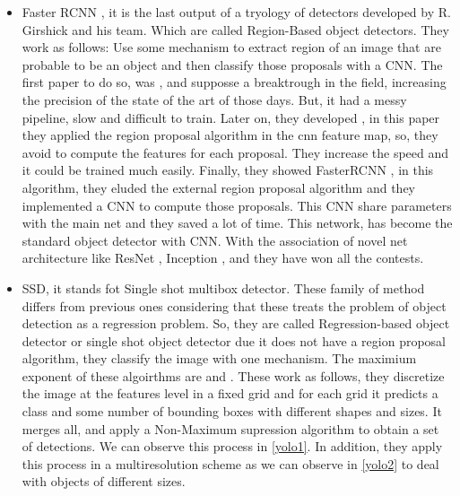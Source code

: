 \documentclass[12pt, a4paper, titlepage,twoside,openright]{article}
\begin{document}
\begin{itemize}

\item Faster RCNN \cite{fasterrcnn}, it is the last output of a tryology of detectors developed by R. Girshick and his team. Which are called Region-Based object detectors. They work as follows: Use some mechanism to extract region of an image that are probable to be an object and then classify those proposals with a CNN. The first paper to do so, was \cite{rcnn}, and supposse a breaktrough in the field, increasing the precision of the state of the art of those days. But, it had a messy pipeline, slow and difficult to train. Later on, they developed \cite{fastrcnn}, in this paper they applied the region proposal algorithm in the cnn feature map, so, they avoid to compute the features for each proposal. They increase the speed and it could be trained much easily. Finally, they showed FasterRCNN \cite{fasterrcnn}, in this algorithm, they eluded the external region proposal algorithm and they implemented a CNN to compute those proposals. This CNN share parameters with the main net and they saved a lot of time. This network, has become the standard object detector with CNN. With the association of novel net architecture like ResNet \cite{resnet}, Inception \cite{inception}, and \cite{pvanet} they have won all the contests.


\item SSD, it stands fot Single shot multibox detector. These family of method differs from previous ones considering that these treats the problem of object detection as a regression problem. So, they are called Regression-based object detector or single shot object detector due it does not have a region proposal algorithm, they classify the image with one mechanism. The maximium exponent of these algoirthms are \cite{yolo} and \cite{ssd}. These work as follows, they discretize the image at the features level in a fixed grid and for each grid it predicts a class and some number of bounding boxes with different shapes and sizes. It merges all, and apply a Non-Maximum supression algorithm to obtain a set of detections. We can observe this process in \ref{yolo1}. In addition, they apply this process in a multiresolution scheme as we can observe in \ref{yolo2} to deal with objects of different sizes.



\end{itemize}
\end{document}

